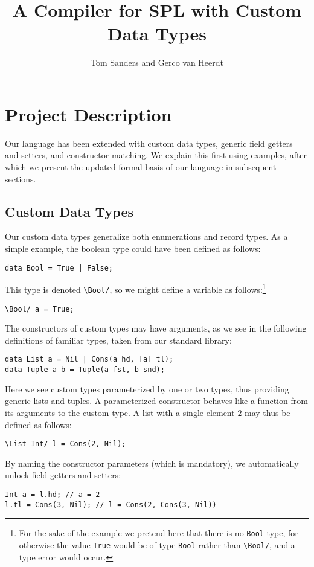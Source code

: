 \documentclass[a4paper]{article}
\title{A Compiler for SPL with Custom Data Types}
\author{Tom Sanders and Gerco van Heerdt}
\begin{document}
\maketitle

\section{Project Description}

Our language has been extended with custom data types, generic field getters and setters, and constructor matching.
We explain this first using examples, after which we present the updated formal basis of our language in subsequent sections.

\subsection{Custom Data Types}

Our custom data types generalize both enumerations and record types.
As a simple example, the boolean type could have been defined as follows:
\begin{verbatim}
data Bool = True | False;\end{verbatim}
This type is denoted \verb+\Bool/+, so we might define a variable as follows:\footnote{%
    For the sake of the example we pretend here that there is no \verb+Bool+ type, for otherwise the value \verb+True+ would be of type \verb+Bool+ rather than \verb+\Bool/+, and a type error would occur.
}
\begin{verbatim}
\Bool/ a = True;\end{verbatim}
The constructors of custom types may have arguments, as we see in the following definitions of familiar types, taken from our standard library:
\begin{verbatim}
data List a = Nil | Cons(a hd, [a] tl);
data Tuple a b = Tuple(a fst, b snd);\end{verbatim}
Here we see custom types parameterized by one or two types, thus providing generic lists and tuples.
A parameterized constructor behaves like a function from its arguments to the custom type.
A list with a single element $2$ may thus be defined as follows:
\begin{verbatim}
\List Int/ l = Cons(2, Nil);\end{verbatim}
By naming the constructor parameters (which is mandatory), we automatically unlock field getters and setters:
\begin{verbatim}
Int a = l.hd; // a = 2
l.tl = Cons(3, Nil); // l = Cons(2, Cons(3, Nil))\end{verbatim}
\end{document}

